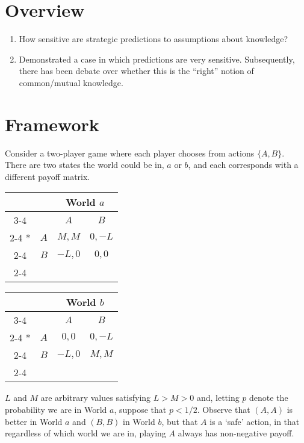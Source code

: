 
\section*{Overview}
\begin{enumerate}
	\item How sensitive are strategic predictions to assumptions about knowledge?
	\item Demonstrated a case in which predictions are very sensitive.  Subsequently, there has been debate over whether this is the ``right'' notion of common/mutual knowledge.
\end{enumerate}

\section*{Framework}


Consider a two-player game where each player chooses from actions $\{A,B\}$.  There are two states the world could be in, $a$ or $b$, and each corresponds with a different payoff matrix.

 \begin{table}[H]
 	\centering
	\setlength{\extrarowheight}{2pt}
	\begin{tabular}{*{4}{c|}}
		\multicolumn{2}{c}{} & \multicolumn{2}{c}{World $a$}\\\cline{3-4}
		\multicolumn{1}{c}{} &  & $A$  & $B$ \\\cline{2-4}
		\multirow{2}*{}  & $A$ & $M,M$ & $0,-L$ \\\cline{2-4}
		& $B$ & $-L,0$ & $0,0$ \\\cline{2-4}
	\end{tabular}
	\begin{tabular}{*{4}{c|}}
	\multicolumn{2}{c}{} & \multicolumn{2}{c}{World $b$}\\\cline{3-4}
	\multicolumn{1}{c}{} &  & $A$  & $B$ \\\cline{2-4}
	\multirow{2}*{}  & $A$ & $0,0$ & $0,-L$ \\\cline{2-4}
	& $B$ & $-L,0$ & $M,M$ \\\cline{2-4}
\end{tabular}
\end{table}

$L$ and $M$ are arbitrary values satisfying $L>M>0$ and, letting $p$ denote the probability we are in World $a$, suppose that $p<1/2$.  Observe that $(A,A)$ is better in World $a$ and $(B,B)$ in World $b$, but that $A$ is a `safe' action, in that regardless of which world we are in, playing $A$ always has non-negative payoff.

